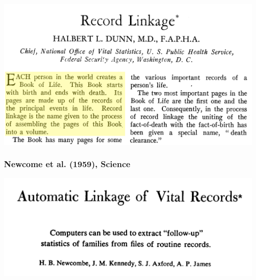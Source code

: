 \documentclass[compress]{beamer}
\newcommand{\1}[1]{\mathbb{I}\!\left[#1\right]} %
\theoremstyle{plain}
\begin{document}
\begin{frame}
    \begin{center}
        \includegraphics[width=\linewidth]{dunn}
    \end{center}
    

\end{frame}






\begin{frame}
\frametitle{Newcome et al. (1959), Science}


\begin{center}
    \includegraphics[width=\linewidth]{newcombe}
\end{center}
\end{frame}
\end{document}
